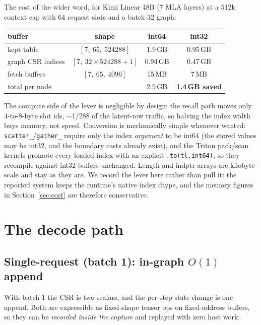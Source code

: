 \documentclass[11pt]{article}
\begin{document}
The cost of the wider word, for Kimi Linear 48B (7 MLA layers) at a
512k context cap with 64 request slots and a batch-32 graph:

\begin{center}
\small
\begin{tabular}{@{}lccc@{}}
\toprule
buffer & shape & int64 & int32\\
\midrule
kept table & $[7,\ 65,\ 524288]$ & 1.9\,GB & 0.95\,GB\\
graph CSR indices & $[7,\ 32\times524288{+}1]$ & 0.94\,GB & 0.47\,GB\\
fetch buffers & $[7,\ 65,\ 4096]$ & 15\,MB & 7\,MB\\
\midrule
total per node & & 2.9\,GB & \textbf{1.4\,GB saved}\\
\bottomrule
\end{tabular}
\end{center}

The compute side of the lever is negligible by design: the recall path
moves only 4-to-8-byte slot ids, $\sim$1/288 of the latent-row traffic, so
halving the index width buys memory, not speed. Conversion is mechanically
simple whenever wanted: \texttt{scatter\_}/\texttt{gather\_} require only
the index \emph{argument} to be int64 (the stored values may be int32, and
the boundary casts already exist), and the Triton pack/scan kernels
promote every loaded index with an explicit \texttt{.to(tl.int64)}, so
they recompile against int32 buffers unchanged. Length and indptr arrays
are kilobyte-scale and stay as they are. We record the lever here rather
than pull it: the reported system keeps the runtime's native index dtype,
and the memory figures in Section~\ref{sec:cost} are therefore
conservative.

\section{The decode path}\label{sec:decode}

\subsection{Single-request (batch 1): in-graph $O(1)$ append}
With batch 1 the CSR is two scalars, and the per-step state change is one
append. Both are expressible as fixed-shape tensor ops on fixed-address
buffers, so they can be \emph{recorded inside the capture} and replayed with
zero host work:
\end{document}
